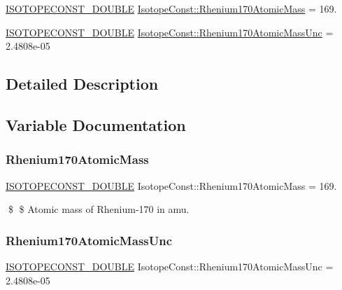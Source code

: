 \begin{DoxyCompactItemize}
\item 
\mbox{\hyperlink{group___isotope_const-_macros_ga8f45a7272ce02c0b4c65c44636ed719a}{I\+S\+O\+T\+O\+P\+E\+C\+O\+N\+S\+T\+\_\+\+D\+O\+U\+B\+LE}} \mbox{\hyperlink{group___isotope_const-_rhenium-_re170_gadb5f23ab5d9a7dcbd9de7b578836020b}{Isotope\+Const\+::\+Rhenium170\+Atomic\+Mass}} = 169.
\item 
\mbox{\hyperlink{group___isotope_const-_macros_ga8f45a7272ce02c0b4c65c44636ed719a}{I\+S\+O\+T\+O\+P\+E\+C\+O\+N\+S\+T\+\_\+\+D\+O\+U\+B\+LE}} \mbox{\hyperlink{group___isotope_const-_rhenium-_re170_ga65ddf6cd4519c79c5d36479027455925}{Isotope\+Const\+::\+Rhenium170\+Atomic\+Mass\+Unc}} = 2.\+4808e-\/05
\end{DoxyCompactItemize}


\subsection{Detailed Description}


\subsection{Variable Documentation}
\mbox{\label{group___isotope_const-_rhenium-_re170_gadb5f23ab5d9a7dcbd9de7b578836020b}} 
\subsubsection{\texorpdfstring{Rhenium170\+Atomic\+Mass}{Rhenium170AtomicMass}}
{\footnotesize\ttfamily \mbox{\hyperlink{group___isotope_const-_macros_ga8f45a7272ce02c0b4c65c44636ed719a}{I\+S\+O\+T\+O\+P\+E\+C\+O\+N\+S\+T\+\_\+\+D\+O\+U\+B\+LE}} Isotope\+Const\+::\+Rhenium170\+Atomic\+Mass = 169.}

\$ \$ Atomic mass of Rhenium-\/170 in amu. \mbox{\label{group___isotope_const-_rhenium-_re170_ga65ddf6cd4519c79c5d36479027455925}} 
\subsubsection{\texorpdfstring{Rhenium170\+Atomic\+Mass\+Unc}{Rhenium170AtomicMassUnc}}
{\footnotesize\ttfamily \mbox{\hyperlink{group___isotope_const-_macros_ga8f45a7272ce02c0b4c65c44636ed719a}{I\+S\+O\+T\+O\+P\+E\+C\+O\+N\+S\+T\+\_\+\+D\+O\+U\+B\+LE}} Isotope\+Const\+::\+Rhenium170\+Atomic\+Mass\+Unc = 2.\+4808e-\/05}

